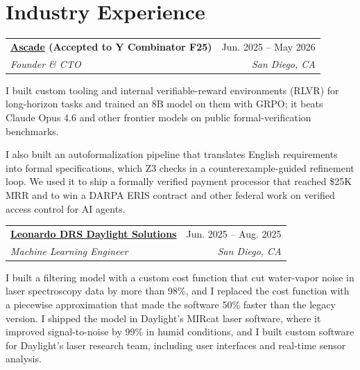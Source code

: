\documentclass[letterpaper,10pt]{article}
\makeatletter
\newif\ifafterhead
\newcommand{\cvEntry}[4]{%
  \par\ifafterhead\vspace{5.2pt}\else\vspace{5pt}\fi\global\afterheadfalse\hspace*{0.15in}%
  \begin{tabular*}{0.97\textwidth}[t]{l@{\extracolsep{\fill}}r}
    \textbf{#1} & #2 \\
    \textit{\small #3} & \textit{\small #4} \\
  \end{tabular*}\par\nopagebreak\vspace{-0.2pt}\nopagebreak}
\makeatother
\begin{document}
\section{Industry Experience}
\cvEntry{\href{https://ascade.co/}{Ascade} (Accepted to Y Combinator F25)}{Jun. 2025 -- May 2026}
  {Founder \& CTO}{San Diego, CA}
\begin{cvBody}
I built custom tooling and internal verifiable-reward environments (RLVR) for long-horizon tasks and trained an 8B model on them with GRPO; it beats Claude Opus 4.6 and other frontier models on public formal-verification benchmarks.

I also built an autoformalization pipeline that translates English requirements into formal specifications, which Z3 checks in a counterexample-guided refinement loop. We used it to ship a formally verified payment processor that reached \$25K MRR and to win a DARPA ERIS contract and other federal work on verified access control for AI agents.
\end{cvBody}

\cvEntry{\href{https://www.daylightsolutions.com/}{Leonardo DRS Daylight Solutions}}{Jun. 2025 -- Aug. 2025}
  {Machine Learning Engineer}{San Diego, CA}
\begin{cvBody}
I built a filtering model with a custom cost function that cut water-vapor noise in laser spectroscopy data by more than 98\%, and I replaced the cost function with a piecewise approximation that made the software 50\% faster than the legacy version. I shipped the model in Daylight's MIRcat laser software, where it improved signal-to-noise by 99\% in humid conditions, and I built custom software for Daylight's laser research team, including user interfaces and real-time sensor analysis.
\end{cvBody}

\end{document}
